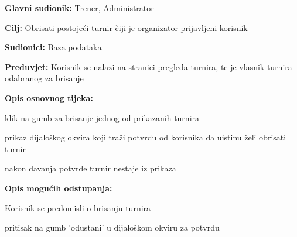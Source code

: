 					\noindent {}
					\begin{packed_item}
	
						\item \textbf{Glavni sudionik: }Trener, Administrator
						\item  \textbf{Cilj: } Obrisati postojeći turnir čiji je organizator prijavljeni korisnik
						\item  \textbf{Sudionici: } Baza podataka
						\item  \textbf{Preduvjet: } Korisnik se nalazi na stranici pregleda turnira, te je vlasnik turnira odabranog za brisanje
						\item  \textbf{Opis osnovnog tijeka:}
						
						\item[] \begin{packed_enum}
	
							\item klik na gumb za brisanje jednog od prikazanih turnira
							\item prikaz dijaloškog okvira koji traži potvrdu od korisnika da uistinu želi obrisati turnir
							\item nakon davanja potvrde turnir nestaje iz prikaza
							
						\end{packed_enum}
						
						\item  \textbf{Opis mogućih odstupanja:}
						
						\item[] \begin{packed_item}
	
							\item[3.a] Korisnik se predomisli o brisanju turnira
							\item[] \begin{packed_enum}
								
								\item pritisak na gumb 'odustani' u dijaloškom okviru za potvrdu
								
							\end{packed_enum}
							
						\end{packed_item}
					\end{packed_item}
				
					\eject
					
